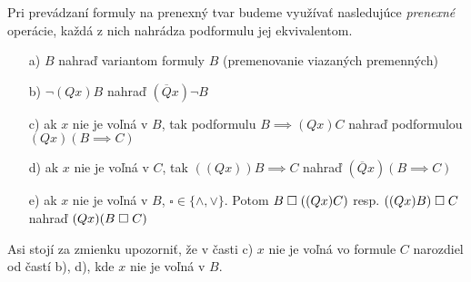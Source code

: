 Pri prevádzaní formuly na prenexný tvar budeme využívať nasledujúce
\emph{prenexné} operácie, každá z nich nahrádza podformulu
jej ekvivalentom.
\begin{itemize}
    \item[a)] $B$ nahraď variantom formuly $B$ (premenovanie viazaných
    premenných)
    \item[b)] $\neg(Q x) B$ nahraď $(\overline{Q} x) \neg B$
    \item[c)] ak $x$ nie je voľná v $B$, tak podformulu $B\implies (Qx)C$
            nahraď podformulou $(Qx) (B\implies C)$
    \item[d)] ak $x$ nie je voľná v $C$, tak $((Qx)) B \implies C$
        nahraď $(\overline{Q} x) (B \implies C)$
    \item[e)] ak $x$ nie je voľná v $B$, $\square \in \{\land,\lor\}$.
     Potom $B \;\square\; ((Qx)C)$ resp. $((Qx)B)\;\square\; C$ nahraď
     $(Qx)(B \;\square\; C)$
\end{itemize}
\begin{poznamka}
    Asi stojí za zmienku upozorniť, že v časti c) $x$ nie je voľná vo
    formule $C$ narozdiel od častí b), d), kde $x$ nie je voľná v $B$.
\end{poznamka}

